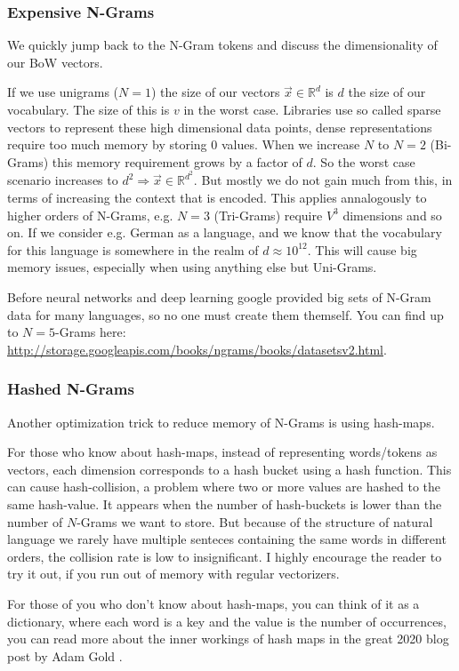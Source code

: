 \subsubsection{Expensive N-Grams}
We quickly jump back to the N-Gram tokens and discuss the dimensionality of our BoW vectors.

If we use unigrams ($N = 1$) the size of our vectors $\vec{x} \in \mathbb{R}^d$ is $d$ the size of our vocabulary.
The size of this is $v$ in the worst case. Libraries use so called sparse vectors to represent these
high dimensional data points, dense representations require too much memory by storing $0$ values.
When we increase $N$ to $N=2$ (Bi-Grams) this memory requirement grows by a factor of $d$. So the worst case
scenario increases to $d^2 \Rightarrow \vec{x} \in \mathbb{R}^{d^2}$.
But mostly we do not gain much from this, in terms of increasing the context that is encoded.
This applies annalogously to higher orders of N-Grams, e.g. $N=3$ (Tri-Grams) require $V^3$ dimensions and so on.
If we consider e.g. German as a language, and we know that the vocabulary for this language is somewhere in the realm of $d \approx 10^{12}$.
This will cause big memory issues, especially when using anything else but Uni-Grams.

Before neural networks and deep learning google provided big sets of N-Gram data for many languages, so no one must create them
themself. You can find up to $N=5$-Grams here: \url{http://storage.googleapis.com/books/ngrams/books/datasetsv2.html}.

\subsubsection{Hashed N-Grams}
Another optimization trick to reduce memory of N-Grams is using hash-maps.

For those who know about hash-maps, instead of representing words/tokens as vectors, each dimension corresponds to a hash bucket
using a hash function.
This can cause hash-collision, a problem where two or more values are hashed to the same hash-value. It appears when the number of hash-buckets
is lower than the number of $N$-Grams we want to store.
But because of the structure of natural language we rarely have multiple senteces containing the same words in different orders, the collision rate is low to insignificant.
I highly encourage the reader to try it out, if you run out of memory with regular vectorizers.

For those of you who don't know about hash-maps, you can think of it as a dictionary, where each word is a key and the value is the number of occurrences, you can read more about
the inner workings of hash maps in the great 2020 blog post by Adam Gold \cite{adamgold:hash-maps}.

